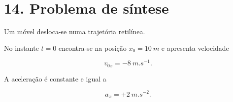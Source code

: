 \documentclass[11pt,a4paper]{article}
\begin{document}
	\section{14. Problema de síntese}
	
	\begin{desafio}
		
		Um móvel desloca-se numa trajetória retilínea.
		
		No instante $t=0$ encontra-se na posição $x_0=\SI{10}{m}$ e apresenta
		velocidade
		
		\[
		v_{0x}=-\SI{8}{m.s^{-1}}.
		\]
		
		A aceleração é constante e igual a
		
		\[
		a_x=+\SI{2}{m.s^{-2}}.
		\]
		
	\end{desafio}
	
\end{document}
